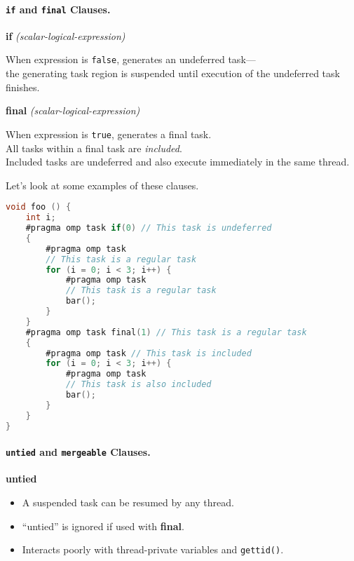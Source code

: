 \paragraph{{\tt if} and {\tt final} Clauses.}

  \begin{center}
  {\bf if} {\it(scalar-logical-expression)}
  \end{center}

    When expression is {\tt false}, generates an undeferred task---\\
    the generating task region is suspended until execution of the
      undeferred task finishes.\\[1em]

  \begin{center}
  {\bf final} {\it(scalar-logical-expression)}
  \end{center}

    When expression is {\tt true}, generates a final task.\\
    All tasks within a final task are {\it included}.\\
    Included tasks are undeferred and also execute immediately in the same thread.

Let's look at some examples of these clauses.
  \begin{lstlisting}[language=C]
void foo () {
    int i;
    #pragma omp task if(0) // This task is undeferred
    {
        #pragma omp task
        // This task is a regular task
        for (i = 0; i < 3; i++) {
            #pragma omp task
            // This task is a regular task
            bar();
        }
    }
    #pragma omp task final(1) // This task is a regular task
    {
        #pragma omp task // This task is included
        for (i = 0; i < 3; i++) {
            #pragma omp task
            // This task is also included
            bar();
        }
    }
}
  \end{lstlisting}

\paragraph{{\tt untied} and {\tt mergeable} Clauses.}

\begin{center}
  {\bf untied}
\end{center}
  \begin{itemize}
    \item A suspended task can be resumed by any thread.
    \item ``untied'' is ignored if used with {\bf final}.
    \item Interacts poorly with thread-private variables and {\tt gettid()}.
  \end{itemize}

